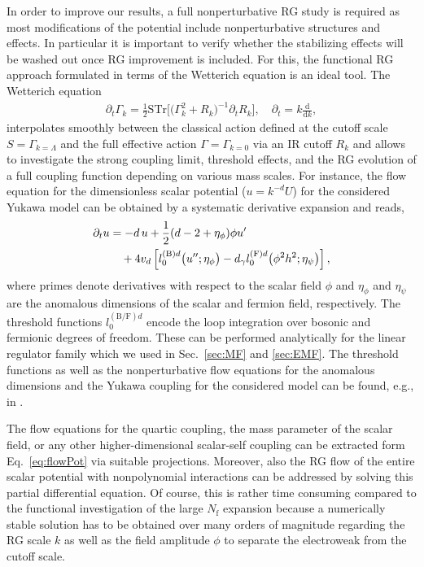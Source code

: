 \documentclass[twocolumn,aps,prd,showpacs,nofootinbib,superscriptaddress,preprintnumbers,floatfix,10pt]{revtex4-1}
\newcommand{\STr}{\text{STr}}
\newcommand{\Nf}{N_{\mathrm{f}}}
\newcommand{\pt}{\partial_t}
\newcommand{\rmB}{\mathrm{B}}
\newcommand{\rmF}{\mathrm{F}}
\begin{document}
In order to improve our results, a full nonperturbative RG study is required as most modifications of the potential include nonperturbative structures and effects. 
In particular it is important to verify whether the stabilizing effects will be washed out once RG improvement is included.
For this, the functional RG approach formulated in terms of the Wetterich equation \cite{Wetterich:1992yh} is an ideal tool. The Wetterich equation
%
\begin{align}
 \pt \Gamma_{k} = \frac{1}{2} \STr \Big[ \big(\Gamma_{k}^{2} + R_{k} \big)^{-1} \pt R_{k} \Big], \quad \pt = k \frac{\mathrm{d}}{\mathrm{d}k},
\end{align}
%
interpolates smoothly between the classical action defined at the cutoff scale $S = \Gamma_{k=\Lambda}$ and the full effective action $\Gamma = \Gamma_{k=0}$ via an IR cutoff $R_{k}$ and allows to investigate the strong coupling limit, threshold effects, and the RG evolution of a full coupling function depending on various mass scales. 
For instance, the flow equation for the dimensionless scalar potential ($u = k^{-d}U$) for the considered Yukawa model can be obtained by a systematic derivative expansion and reads,
%
\begin{align}
 \pt u &= -d\, u + \frac{1}{2}(d-2+\eta_{\phi})\phi u' \notag \\
 &\quad+ 4v_{d} \left[l_{0}^{(\rmB)d}\big(u'';\eta_{\phi}\big) - d_{\gamma} l_{0}^{(\rmF)d}\big(\phi^{2} h^{2};\eta_{\psi}\big) \right],
 \label{eq:flowPot}
\end{align}
%
where primes denote derivatives with respect to the scalar field $\phi$ and $\eta_{\phi}$ and $\eta_{\psi}$ are the anomalous dimensions of the scalar and fermion field, respectively. %
The threshold functions $l_{0}^{(\rmB/\rmF)d}$ encode the loop integration over bosonic and fermionic degrees of freedom. These can be performed analytically for the linear regulator family which we used in Sec.~\ref{sec:MF} and \ref{sec:EMF}. The threshold functions as well as the nonperturbative flow equations for the anomalous dimensions and the Yukawa coupling for the considered model can be found, e.g., in \cite{Gies:2017zwf}.


The flow equations for the quartic coupling, the mass parameter of the scalar field, or any other higher-dimensional scalar-self coupling can be extracted form Eq.~\eqref{eq:flowPot} via suitable projections. Moreover, also the RG flow of the entire scalar potential with nonpolynomial interactions can be addressed by solving this partial differential equation. Of course, this is rather time consuming compared to the functional investigation of the large $\Nf$ expansion because a numerically stable solution has to be obtained over many orders of magnitude regarding the RG scale $k$ as well as the field amplitude $\phi$ to separate the electroweak from the cutoff scale.
\end{document}
